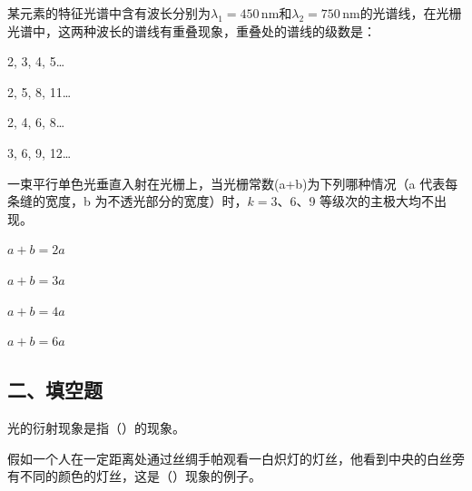 \documentclass[padl, analysis, notocnum]{ExBook}
\newcommand{\answerarea}[1][3.5cm]{%
  \par\vspace{1mm}%
  \noindent{\color{themeColor!35}\rule{\linewidth}{0.4pt}}\par
  \noindent\begin{minipage}[t][#1][t]{\linewidth}\vspace{0pt}\end{minipage}\par
  \noindent{\color{themeColor!35}\rule{\linewidth}{0.4pt}}\par
}
\begin{document}
\begin{qitems}[startnum=15]
\qitem 某元素的特征光谱中含有波长分别为$\lambda_{1}=450\,\mathrm{nm}$和$\lambda_{2}=750\,\mathrm{nm}$的光谱线，在光栅光谱中，这两种波长的谱线有重叠现象，重叠处的谱线的级数是：
\par\noindent\hspace{2em}2, 3, 4, 5…
\par\noindent\hspace{2em}2, 5, 8, 11…
\par\noindent\hspace{2em}2, 4, 6, 8…
\par\noindent\hspace{2em}3, 6, 9, 12…
\label{q:273:start}
\answerarea[4.0cm]
\label{q:273:end}
\end{qitems}

\begin{qitems}[startnum=16]
\qitem 一束平行单色光垂直入射在光栅上，当光栅常数(a+b)为下列哪种情况（a 代表每条缝的宽度，b 为不透光部分的宽度）时，$k=3$、6、9 等级次的主极大均不出现。
\par\noindent\hspace{2em}$a+b=2a$
\par\noindent\hspace{2em}$a+b=3a$
\par\noindent\hspace{2em}$a+b=4a$
\par\noindent\hspace{2em}$a+b=6a$
\label{q:274:start}
\answerarea[4.0cm]
\label{q:274:end}
\end{qitems}

\subsection{二、填空题}
\begin{qitems}[startnum=1]
\qitem 光的衍射现象是指（\hspace{1.6em}）的现象。
\label{q:275:start}
\answerarea[4.0cm]
\label{q:275:end}
\end{qitems}

\begin{qitems}[startnum=2]
\qitem 假如一个人在一定距离处通过丝绸手帕观看一白炽灯的灯丝，他看到中央的白丝旁有不同的颜色的灯丝，这是（\hspace{1.6em}）现象的例子。
\label{q:276:start}
\answerarea[4.0cm]
\label{q:276:end}
\end{qitems}
\end{document}
